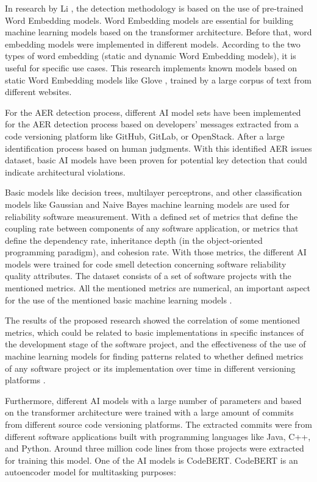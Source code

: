 In research by Li \cite{er_word_embedding}, the detection methodology is based on the use of pre-trained Word Embedding models. Word Embedding models are essential for building machine learning models based on the transformer architecture. Before that, word embedding models were implemented in different models. According to the two types of word embedding (static and dynamic Word Embedding models), it is useful for specific use cases. This research implements known models based on static Word Embedding models like Glove \cite{glove}, trained by a large corpus of text from different websites.


For the AER detection process, different AI model sets have been implemented for the AER detection process based on developers' messages extracted from a code versioning platform like GitHub, GitLab, or OpenStack. After a large identification process based on human judgments. With this identified AER issues dataset, basic AI models have been proven for potential key detection that could indicate architectural violations. 


Basic models like decision trees, multilayer perceptrons, and other classification models like Gaussian and Naive Bayes machine learning models are used for reliability software measurement. With a defined set of metrics that define the coupling rate between components of any software application, or metrics that define the dependency rate, inheritance depth (in the object-oriented programming paradigm), and cohesion rate. With those metrics, the different AI models were trained for code smell detection concerning software reliability quality attributes. The dataset consists of a set of software projects with the mentioned metrics. All the mentioned metrics are numerical, an important aspect for the use of the mentioned basic machine learning models \cite{perceptron_model}.

The results of the proposed research showed the correlation of some mentioned metrics, which could be related to basic implementations in specific instances of the development stage of the software project, and the effectiveness of the use of machine learning models for finding patterns related to whether defined metrics of any software project or its implementation over time in different versioning platforms  \cite{perceptron_model}.


Furthermore, different AI models with a large number of parameters and based on the transformer architecture were trained with a large amount of commits from different source code versioning platforms. The extracted commits were from different software applications built with programming languages like Java, C++, and Python. Around three million code lines from those projects were extracted for training this model. 
One of the AI models is CodeBERT. CodeBERT is an autoencoder model for multitasking purposes: 

